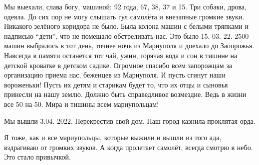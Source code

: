 
Мы выехали, слава богу, машиной: 92 года, 67, 38, 37 и 15. Три
собаки, дрова, одеяла. До сих пор не могу слышать гул самолёта и внезапные громкие
звуки. Никакого зелёного коридора не было. Была колона машин с белыми тряпками и
надписью \enquote{дети}, что не помешало обстреливать нас. Это было 15. 03. 22. 2500 машин
выбралось в тот день, точнее ночь из Мариуполя и доехало до Запорожья. Навсегда в
памяти останется тот чай, ужин, горячая вода и сон в тишине на детской кроватке в
детском садике. Огромное спасибо всем запорожцам за организацию приема нас,
беженцев из Мариуполя. И пусть сгинут наши вороженьки! Пусть их детям и старикам
будет то, что их отцы и сыновья принесли на нашу землю. Должно быть справедливое
возмездие. Ведь в жизни все 50 на 50. Мира и тишины всем мариупольцам!


Мы вышли 3.04. 2022. Перекрестив свой дом. Наш город казнила проклятая орда.

Я тоже, как и все мариупольцы, которые выжили и вышли из того ада, вздрагиваю
от громких звуков. А когда пролетает самолёт, всегда смотрю в небо. Это стало
привычкой.
